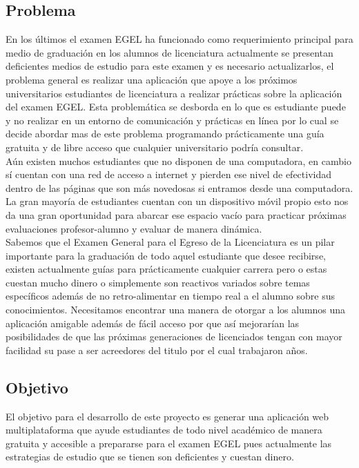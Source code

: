 \documentclass[12pt]{book}
\begin{document}
	\subsection{Problema}
	{\normalsize En los últimos el examen EGEL ha funcionado como requerimiento principal para medio de graduación en los alumnos de licenciatura actualmente se presentan deficientes medios de estudio para este examen y es necesario actualizarlos,  el problema general es realizar una aplicación que apoye a los próximos universitarios estudiantes de licenciatura a realizar prácticas sobre la aplicación del examen EGEL. Esta problemática se desborda en lo que es estudiante puede y no realizar en un entorno de comunicación y prácticas en línea por lo cual se decide abordar mas de este problema programando prácticamente una guía gratuita y de libre acceso que cualquier universitario podría consultar. \\ 
    Aún existen muchos estudiantes que no disponen de una computadora, en cambio sí cuentan con una red de acceso a internet y pierden ese nivel de efectividad dentro de las páginas que son más novedosas si entramos desde una computadora. La gran mayoría de estudiantes cuentan con un dispositivo móvil propio esto nos da una gran oportunidad para abarcar ese espacio vacío para practicar próximas evaluaciones profesor-alumno y evaluar de manera dinámica.
    \\
    Sabemos que el Examen General para el Egreso de la Licenciatura es un pilar importante para la graduación de todo aquel estudiante que desee recibirse, existen actualmente guías para prácticamente cualquier carrera pero o estas cuestan mucho dinero o simplemente son reactivos variados sobre temas específicos además de no retro-alimentar en tiempo real a el alumno sobre sus conocimientos. Necesitamos encontrar una manera de otorgar a los alumnos una aplicación amigable además de fácil acceso por que así mejorarían las posibilidades de que las próximas generaciones de licenciados tengan con mayor facilidad su pase a ser acreedores del titulo por el cual trabajaron años. 
	}
	
	\subsection{Objetivo}
	{\normalsize El objetivo para el desarrollo de este proyecto es generar una aplicación web multiplataforma que ayude estudiantes de todo nivel académico de manera gratuita y accesible a prepararse para el examen EGEL pues actualmente las estrategias de estudio que se tienen son deficientes y cuestan dinero. }
 
\end{document}
